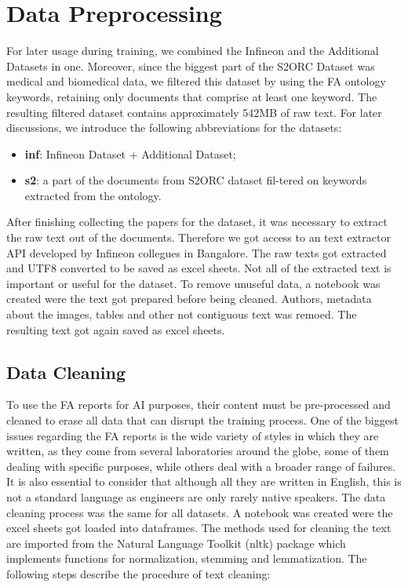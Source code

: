 \section{Data Preprocessing}\label{data_preprocessing}
For later usage during training, we combined the Infineon and the Additional Datasets in one. Moreover, since the biggest part of the S2ORC Dataset was medical and biomedical data, we filtered this dataset by using the FA ontology keywords, retaining only documents that comprise at least one keyword. The resulting filtered dataset contains approximately 542MB of raw text. For later discussions, we introduce the following abbreviations for the datasets:

\begin{itemize}
	\item \textbf{inf}: Infineon Dataset + Additional Dataset;
	\item \textbf{s2}: a part of the documents from S2ORC dataset fil-tered on keywords extracted from the ontology.
\end{itemize}

After finishing collecting the papers for the dataset, it was necessary to extract the raw text out of the documents. Therefore we got access to an text extractor API developed by Infineon collegues in Bangalore. The raw texts got extracted and UTF8 converted to be saved as excel sheets. \newline
Not all of the extracted text is important or useful for the dataset. To remove unuseful data, a notebook was created were the text got prepared before being cleaned. Authors, metadata about the images, tables and other not contiguous text was remoed. The resulting text got again saved as excel sheets.

\subsection{Data Cleaning}
To use the FA reports for AI purposes, their content must be pre-processed and cleaned to erase all data that can disrupt the training process. One of the biggest issues regarding the FA reports is the wide variety of styles in which they are written, as they come from several laboratories around the globe, some of them dealing with specific purposes, while others deal with a broader range of failures. It is also essential to consider that although all they are written in English, this is not a standard language as engineers are only rarely native speakers. \newline
The data cleaning process was the same for all datasets. A notebook was created were the excel sheets got loaded into dataframes. The methods used for cleaning the text are imported from the \alert{Natural Language Toolkit (nltk)} package which implements functions for normalization, stemming and lemmatization.
The following steps describe the procedure of text cleaning:

